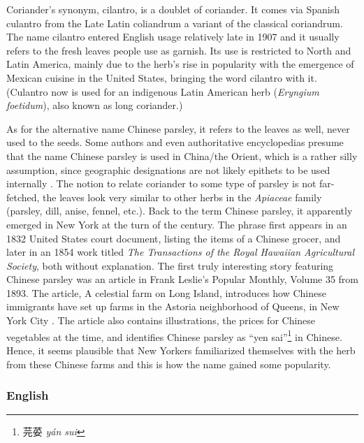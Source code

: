 Coriander’s synonym, cilantro, is a doublet of coriander. It comes via Spanish culantro from the Late Latin coliandrum a variant of the classical coriandrum. The name cilantro entered English usage relatively late in 1907 \parencite{harper_coriander_nodate} and it usually refers to the fresh leaves people use as garnish. Its use is restricted to North and Latin America, mainly due to the herb’s rise in popularity with the emergence of Mexican cuisine in the United States, bringing the word cilantro with it. (Culantro now is used for an indigenous Latin American herb (\textit{Eryngium foetidum}), also known as long coriander.)

As for the alternative name Chinese parsley, it refers to the leaves as well, never used to the seeds. Some authors and even authoritative encyclopedias presume that the name Chinese parsley is used in China/the Orient, which is a rather silly assumption, since geographic designations are not likely epithets to be used internally \parencite[cf.][]{davidson_oxford_2014, oconnell_book_2016}. The notion to relate coriander to some type of parsley is not far-fetched, the leaves look very similar to other herbs in the \textit{Apiaceae} family (parsley, dill, anise, fennel, etc.). Back to the term Chinese parsley, it apparently emerged in New York at the turn of the century. The phrase first appears in an 1832 United States court document, listing the items of a Chinese grocer, and later in an 1854 work titled \textit{The Transactions of the Royal Hawaiian Agricultural Society}, both without explanation. The first truly interesting story featuring Chinese parsley was an article in Frank Leslie's Popular Monthly, Volume 35 from 1893. The article, A celestial farm on Long Island, introduces how Chinese immigrants have set up farms in the Astoria neighborhood of Queens, in New York City \parencite{seitz_celestial_1893} . The article also contains illustrations, the prices for Chinese vegetables at the time, and identifies Chinese parsley as ``yen sai''\footnote{芫荽 \textit{yán sui}} in Chinese. Hence, it seems plausible that New Yorkers familiarized themselves with the herb from these Chinese farms and this is how the name gained some popularity.



\subsubsection{English}



